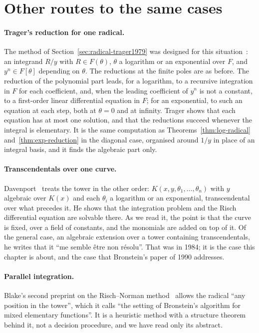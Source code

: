 \section{Other routes to the same cases}\label{sec:elem-others}

\paragraph{Trager's reduction for one radical.} The method of
Section~\ref{sec:radical-trager1979} was designed for this
situation~\cite[Appendix~A]{trager1984}: an integrand $R/y$ with $R \in
F(\theta)$, $\theta$ a logarithm or an exponential over $F$, and $y^n \in
F[\theta]$ depending on $\theta$. The reductions at the finite poles are as
before. The reduction of the polynomial part leads, for a logarithm, to a
recursive integration in $F$ for each coefficient, and, when the leading
coefficient of $y^n$ is not a constant, to a first-order linear differential
equation in $F$; for an exponential, to such an equation at each step, both
at $\theta = 0$ and at infinity. Trager shows that each equation has at most
one solution, and that the reductions succeed whenever the integral is
elementary. It is the same computation as
Theorems~\ref{thm:log-radical} and~\ref{thm:exp-reduction} in the diagonal
case, organised around $1/y$ in place of an integral basis, and it finds
the algebraic part only.

\paragraph{Transcendentals over one curve.} Davenport~\cite{davenport1984}
treats the tower in the other order: $K(x, y, \theta_1, \dots, \theta_n)$
with $y$ algebraic over $K(x)$ and each $\theta_i$ a logarithm or an
exponential, transcendental over what precedes it. He shows that the
integration problem and the Risch differential equation are solvable there.
As we read it, the point is that the curve is fixed, over a field of
constants, and the monomials are added on top of it. Of the general case, an
algebraic extension over a tower containing transcendentals, he writes that
it ``me semble \^etre non r\'esolu''. That was in 1984; it is the case this
chapter is about, and the case that Bronstein's paper of 1990 addresses.

\paragraph{Parallel integration.\later} Blake's second preprint on the
Risch--Norman method~\cite{blake2026b} allows the radical ``any position in
the tower'', which it calls ``the setting of Bronstein's algorithm for mixed
elementary functions''. It is a heuristic method with a structure theorem
behind it, not a decision procedure, and we have read only its abstract.

